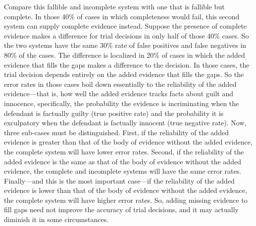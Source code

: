 \documentclass[
  10pt,
  dvipsnames,enabledeprecatedfontcommands]{scrartcl}
\begin{document}
Compare this fallible and incomplete system with one that is fallible
but complete. In those 40\% of cases in which completeness would fail,
this second system can supply complete evidence instead. Suppose the
presence of complete evidence makes a difference for trial decisions in
only half of those 40\% cases. So the two systems have the same 30\%
rate of false positives and false negatives in 80\% of the cases. The
difference is localized in 20\% of cases in which the added evidence
that fills the gaps makes a difference to the decision. In those cases,
the trial decision depends entirely on the added evidence that fills the
gaps. So the error rates in those cases boil down essentially to the
reliability of the added evidence---that is, how well the added evidence
tracks facts about guilt and innocence, specifically, the probability
the evidence is incriminating when the defendant is factually guilty
(true positive rate) and the probability it is exculpatory when the
defendant is factually innocent (true negative rate). Now, three
sub-cases must be distinguished. First, if the reliability of the added
evidence is greater than that of the body of evidence without the added
evidence, the complete system will have lower error rates. Second, if
the reliability of the added evidence is the same as that of the body of
evidence without the added evidence, the complete and incomplete systems
will have the same error rates. Finally---and this is the most important
case---if the reliability of the added evidence is lower than that of
the body of evidence without the added evidence, the complete system
will have higher error rates. So, adding missing evidence to fill gaps
need not improve the accuracy of trial decisions, and it may actually
diminish it in some circumstances.
\end{document}
